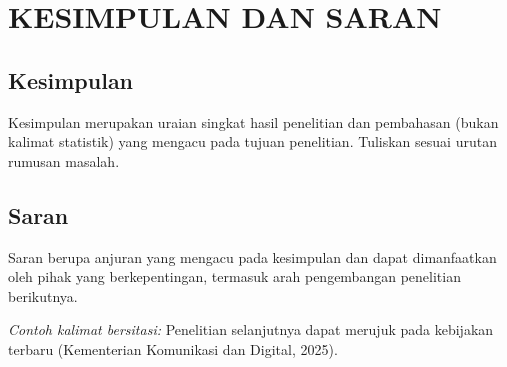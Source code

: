 \chapter{KESIMPULAN DAN SARAN}

\section{Kesimpulan}
Kesimpulan merupakan uraian singkat hasil penelitian dan pembahasan (bukan kalimat statistik) yang mengacu pada tujuan penelitian. Tuliskan sesuai urutan rumusan masalah.

\section{Saran}
Saran berupa anjuran yang mengacu pada kesimpulan dan dapat dimanfaatkan oleh pihak yang berkepentingan, termasuk arah pengembangan penelitian berikutnya.

\textit{Contoh kalimat bersitasi:} Penelitian selanjutnya dapat merujuk pada kebijakan terbaru (Kementerian Komunikasi dan Digital, 2025).
